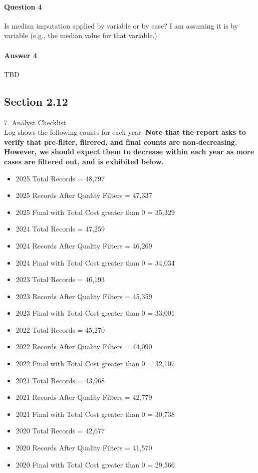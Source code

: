 \documentclass[12pt, letterpaper]{article}
\begin{document}
\paragraph{Question 4} Is median imputation applied by variable or by case? I am assuming it is by variable (e.g., the median value for that variable.)
\paragraph{Answer 4} TBD

\subsection{Section 2.12}


7. Analyst Checklist\\
Log shows the following counts for each year. \bf{Note that the report asks to verify that pre-filter, filrered, and final counts are non-decreasing. However, we should expect them to decrease within each year as more cases are filtered out, and is exhibited below.}
\begin{itemize}
	\item 2025 Total Records = 48,797
	\item 2025 Records After Quality Filters = 47,337
	\item 2025 Final with Total Cost greater than 0 = 35,329
	\item 2024 Total Records = 47,259
	\item 2024 Records After Quality Filters = 46,269
	\item 2024 Final with Total Cost greater than 0 = 	34,034
	\item 2023 Total Records = 46,193
	\item 2023 Records After Quality Filters = 45,359 
	\item 2023 Final with Total Cost greater than 0 = 33,001
	\item 2022 Total Records = 45,270
	\item 2022 Records After Quality Filters = 44,090
	\item 2022 Final with Total Cost greater than 0 = 32,107
	\item 2021 Total Records = 43,968
	\item 2021 Records After Quality Filters = 42,779
	\item 2021 Final with Total Cost greater than 0 = 30,738
	\item 2020 Total Records = 42,677
	\item 2020 Records After Quality Filters = 41,570
	\item 2020 Final with Total Cost greater than 0 = 29,566
\end{itemize}
\end{document}

